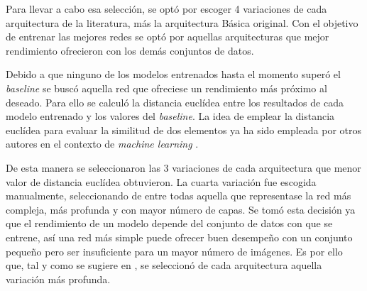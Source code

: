 Para llevar a cabo esa selección, se optó por escoger 4 variaciones de cada arquitectura de la literatura, más la arquitectura Básica original. Con el objetivo de entrenar las mejores redes se optó por aquellas arquitecturas que mejor rendimiento ofrecieron con los demás conjuntos de datos. 

Debido a que ninguno de los modelos entrenados hasta el momento superó el \textit{baseline} se buscó aquella red que ofreciese un rendimiento más próximo al deseado. Para ello se calculó la distancia euclídea entre los resultados de cada modelo entrenado y los valores del \textit{baseline}. La idea de emplear la distancia euclídea para evaluar la similitud de dos elementos ya ha sido empleada por otros autores en el contexto de \textit{machine learning} \cite{conc:euclidea}.

De esta manera se seleccionaron las 3 variaciones de cada arquitectura que menor valor de distancia euclídea obtuvieron. La cuarta variación fue escogida manualmente, seleccionando de entre todas aquella que representase la red más compleja, más profunda y con mayor número de capas. Se tomó esta decisión ya que el rendimiento de un modelo depende del conjunto de datos con que se entrene, así una red más simple puede ofrecer buen desempeño con un conjunto pequeño pero ser insuficiente para un mayor número de imágenes. Es por ello que, tal y como se sugiere en \cite{conc:very_deep, conc:large_deep}, se seleccionó de cada arquitectura aquella variación más profunda.

